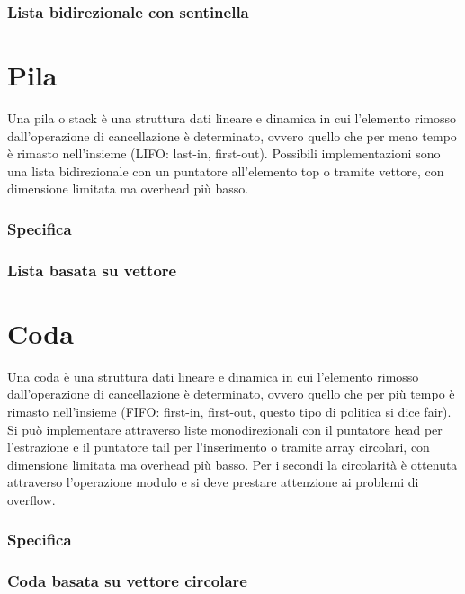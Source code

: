 \subsubsection{Lista bidirezionale con sentinella}

\section{Pila}
Una pila o stack \`e una struttura dati lineare e dinamica in cui l'elemento rimosso dall'operazione di cancellazione \`e determinato, ovvero quello che 
per meno tempo \`e rimasto nell'insieme (LIFO: last-in, first-out). Possibili implementazioni sono una lista bidirezionale con un puntatore all'elemento 
top o tramite vettore, con dimensione limitata ma overhead pi\`u basso. 
\subsubsection{Specifica}

\subsubsection{Lista basata su vettore}

\section{Coda}
Una coda \`e una struttura dati lineare e dinamica in cui l'elemento rimosso dall'operazione di cancellazione \`e determinato, ovvero quello che per pi\`u 
tempo \`e rimasto nell'insieme (FIFO: first-in, first-out, questo tipo di politica si dice fair). Si pu\`o implementare attraverso liste monodirezionali 
con il puntatore head per l'estrazione e il puntatore tail per l'inserimento o tramite array circolari, con dimensione limitata ma overhead pi\`u basso.
Per i secondi la circolarit\`a \`e ottenuta attraverso l'operazione modulo e si deve prestare attenzione ai problemi di overflow.
\subsubsection{Specifica}

\subsubsection{Coda basata su vettore circolare}

